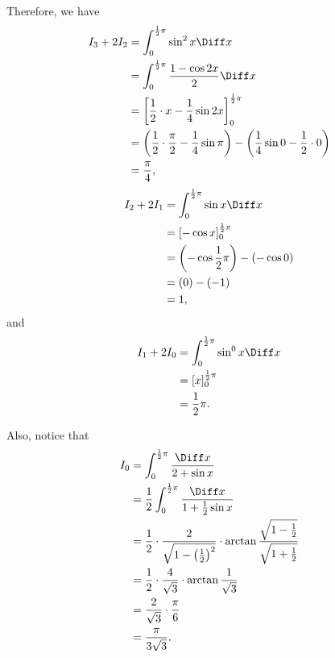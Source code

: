 Therefore, we have
\begin{align*}
    I_3 + 2 I_2 & = \int_{0}^{\frac{1}{2}\pi} \sin^2 x \Diff x                                                                                  \\
                & = \int_{0}^{\frac{1}{2}\pi} \frac{1 - \cos 2x}{2} \Diff x                                                                     \\
                & = \left[\frac{1}{2} \cdot x - \frac{1}{4} \sin 2x\right]_{0}^{\frac{1}{2}\pi}                                                 \\
                & = \left(\frac{1}{2} \cdot \frac{\pi}{2} - \frac{1}{4} \sin \pi\right) - \left(\frac{1}{4} \sin 0 - \frac{1}{2} \cdot 0\right) \\
                & = \frac{\pi}{4},
\end{align*}
\begin{align*}
    I_2 + 2 I_1 & = \int_{0}^{\frac{1}{2}\pi} \sin x \Diff x         \\
                & = [- \cos x]_{0}^{\frac{1}{2}\pi}                  \\
                & = \left(- \cos \frac{1}{2}\pi \right) - (- \cos 0) \\
                & = (0) - (-1)                                       \\
                & = 1,
\end{align*}
and
\begin{align*}
    I_1 + 2 I_0 & = \int_{0}^{\frac{1}{2}\pi} \sin^0 x \Diff x \\
                & = [x]_{0}^{\frac{1}{2}\pi}                   \\
                & = \frac{1}{2}\pi.
\end{align*}

Also, notice that
\begin{align*}
    I_0 & = \int_{0}^{\frac{1}{2}\pi} \frac{\Diff x}{2 + \sin x}                                                                                  \\
        & = \frac{1}{2} \int_{0}^{\frac{1}{2}\pi} \frac{\Diff x}{1 + \frac{1}{2} \sin x}                                                          \\
        & = \frac{1}{2} \cdot \frac{2}{\sqrt{1 - \left(\frac{1}{2}\right)^2}} \cdot \arctan \frac{\sqrt{1 - \frac{1}{2}}}{\sqrt{1 + \frac{1}{2}}} \\
        & = \frac{1}{2} \cdot \frac{4}{\sqrt{3}} \cdot \arctan\frac{1}{\sqrt{3}}                                                                  \\
        & = \frac{2}{\sqrt{3}} \cdot \frac{\pi}{6}                                                                                                \\
        & = \frac{\pi}{3\sqrt{3}}.
\end{align*}

